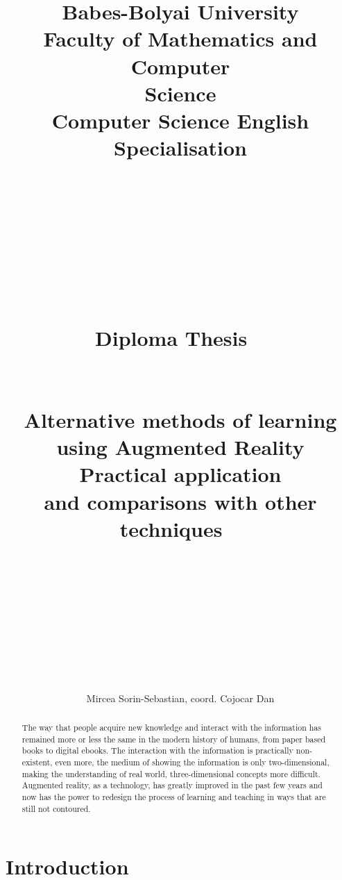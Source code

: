 \documentclass[12 pct]{report}
\begin{document}
\title{%
  { \huge Babes-Bolyai University\\
  Faculty of Mathematics and Computer\\
  Science\\
  Computer Science English Specialisation \\
  }
  \ \\
  \ \\
  \ \\
  \ \\
  \ \\
  \ \\
  {\huge Diploma Thesis}
  \ \\
  \ \\
  \ \\
  Alternative methods of learning using Augmented Reality\\
  Practical application \\
    and comparisons with other techniques
  \ \\
  \ \\
  \ \\
  \ \\
  \ \\
  \ \\
  }

\author{Mircea Sorin-Sebastian, coord. Cojocar Dan}

\maketitle

\begin{abstract}
The way that people acquire new knowledge and interact with the information has remained more or less the same in the modern history of humans, from paper based books to digital ebooks. The interaction with the information is practically non-existent, even more, the medium of showing the information is only two-dimensional, making the understanding of real world, three-dimensional concepts more difficult. Augmented reality, as a technology, has greatly improved in the past few years and now has the power to redesign the process of learning and teaching in ways that are still not contoured.
\end{abstract}

\tableofcontents

\listoffigures

\listoftables

\chapter{Introduction}
\end{document}
